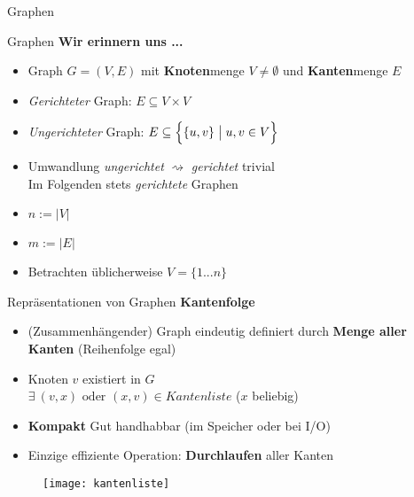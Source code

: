 

\def\haslogo{}




\date{30. Juni \thisyear}



	
	
	\begin{frame}
		\titlepage
	\end{frame}
	
\begin{headframe}
	Graphen
\end{headframe}
	
\begin{frame}{Graphen}
	\textbf{Wir erinnern uns ...} 
	\begin{itemize}
		\item Graph $G = (V, E)$ mit \textbf{Knoten}menge $V \neq \emptyset$ und \textbf{Kanten}menge $E$
		\pause
		\item \emph{Gerichteter} Graph: $E \subseteq V \times V$
		\item \emph{Ungerichteter} Graph: $E \subseteq \Big\lbrace \{u, v\} \bigm| u, v \in V \Big\rbrace$
		\pause
		\item Umwandlung \textit{ungerichtet} $\rightsquigarrow$ \textit{gerichtet} trivial \\ 
		\impl Im Folgenden stets \emph{gerichtete} Graphen
		\pause
		\item $n := |V|$
		\item $m := |E|$
		\pause
		\item Betrachten üblicherweise $V = \{1...n\}$ 
	\end{itemize}
\end{frame}

\begin{frame}{Repräsentationen von Graphen}
	\textbf{Kantenfolge} \\[0,125cm]
	\begin{itemize}
		\item {\small (Zusammenhängender)} Graph eindeutig definiert durch \textbf{Menge aller Kanten} (Reihenfolge egal)
		\pause
		\item Knoten $v$ existiert in $G$ \\ 
		\gdw $\exists\ (v, x) \text{ oder } (x, v) \in \textit{Kantenliste}$ \quad ($x$ beliebig)
		\pause
		\item[\Pros] \textbf{Kompakt} \impl Gut handhabbar (im Speicher oder bei I/O)
		\pause
		\item[\Cons] Einzige effiziente Operation: \textbf{Durchlaufen} aller Kanten
	\end{itemize}
	\begin{figure}[htp]
		\centering
		\texttt{[image: kantenliste]}
	\end{figure}
\end{frame}

